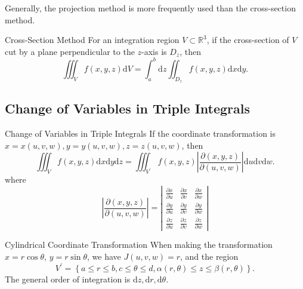 \begin{note}
  Generally, the projection method is more frequently used than the
  cross-section method.
\end{note}

\begin{proposition}{Cross-Section Method}{}
  For an integration region $V \subset \mathbb{R}^3$,
  if the cross-section of $V$ cut by a plane perpendicular
  to the $z$-axis is $D_z$, then
  \begin{equation}
    \iiint _Vf(x,y,z) \mathrm{d}V = \int ^b_a \mathrm{d}z \iint _{D_z}f(x,y,z)\mathrm{d}x\mathrm{d}y.
  \end{equation}
\end{proposition}

\subsection{Change of Variables in Triple Integrals}

\begin{proposition}{Change of Variables in Triple Integrals}{}
  If the coordinate transformation is $x = x(u,v,w), y=y(u,v,w), z=z(u,v,w)$,
  then
  \begin{equation}
     \iiint _V f(x,y,z) \mathrm{d}x\mathrm{d}y\mathrm{d}z = \iiint_{V^{\prime}}f(x,y,z)\left|\frac{\partial (x,y,z)}{\partial(u,v,w)}\right|\mathrm{d}u\mathrm{d}v\mathrm{d}w.
  \end{equation}
  where
  \begin{equation}
    \left|\frac{\partial(x,y,z)}{\partial(u,v,w)}\right| = \left|
      \begin{array}{ccc}
        \frac{\partial x}{\partial u}&\frac{\partial x}{\partial v}&\frac{\partial x}{\partial w}\\
        \frac{\partial y}{\partial u}&\frac{\partial y}{\partial v}&\frac{\partial y}{\partial w} \\
                                     \frac{\partial z}{\partial u}&\frac{\partial z}{\partial v}&\frac{\partial z}{\partial w}
      \end{array}
    \right|
  \end{equation}
\end{proposition}

\begin{proposition}{Cylindrical Coordinate Transformation}{}
  When making the transformation $x = r\cos \theta$, $y = r\sin \theta$,
  we have $J(u,v,w) = r$, and the region
  \begin{equation}
    V^{\prime} = \left\{ a \leq r \leq b, c \leq \theta \leq d, \alpha(r,\theta) \leq z \leq \beta(r,\theta) \right\}.
  \end{equation}
  The general order of integration is $\mathrm{d}z, \mathrm{d} r, \mathrm{d} \theta$.
\end{proposition}


